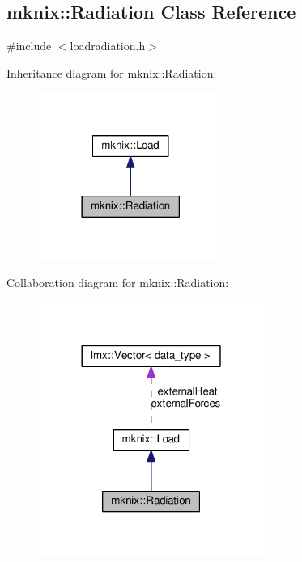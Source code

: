 \hypertarget{classmknix_1_1_radiation}{}\subsection{mknix\+:\+:Radiation Class Reference}
\label{classmknix_1_1_radiation}


{\ttfamily \#include $<$loadradiation.\+h$>$}



Inheritance diagram for mknix\+:\+:Radiation\+:\nopagebreak
\begin{figure}[H]
\begin{center}
\leavevmode
\includegraphics[width=170pt]{df/d27/classmknix_1_1_radiation__inherit__graph}
\end{center}
\end{figure}


Collaboration diagram for mknix\+:\+:Radiation\+:\nopagebreak
\begin{figure}[H]
\begin{center}
\leavevmode
\includegraphics[width=209pt]{da/dd3/classmknix_1_1_radiation__coll__graph}
\end{center}
\end{figure}

